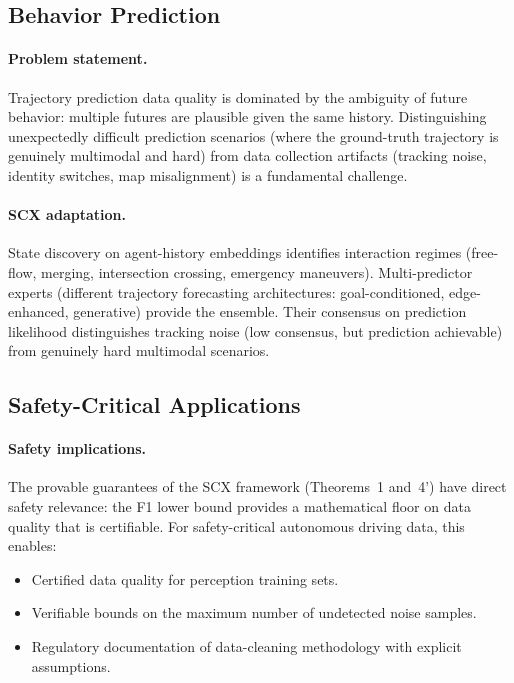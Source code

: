 \documentclass[twocolumn]{article}
\theoremstyle{definition}
\begin{document}
\subsection{Behavior Prediction}

\paragraph{Problem statement.}
Trajectory prediction data quality is dominated by the ambiguity of future behavior: multiple futures are plausible given the same history. Distinguishing unexpectedly difficult prediction scenarios (where the ground-truth trajectory is genuinely multimodal and hard) from data collection artifacts (tracking noise, identity switches, map misalignment) is a fundamental challenge.

\paragraph{SCX adaptation.}
State discovery on agent-history embeddings identifies interaction regimes (free-flow, merging, intersection crossing, emergency maneuvers). Multi-predictor experts (different trajectory forecasting architectures: goal-conditioned, edge-enhanced, generative) provide the ensemble. Their consensus on prediction likelihood distinguishes tracking noise (low consensus, but prediction achievable) from genuinely hard multimodal scenarios.

\subsection{Safety-Critical Applications}

\paragraph{Safety implications.}
The provable guarantees of the SCX framework (Theorems~1 and~4') have direct safety relevance: the F1 lower bound provides a mathematical floor on data quality that is certifiable. For safety-critical autonomous driving data, this enables:
\begin{itemize}[nosep]
  \item Certified data quality for perception training sets.
  \item Verifiable bounds on the maximum number of undetected noise samples.
  \item Regulatory documentation of data-cleaning methodology with explicit assumptions.
\end{itemize}
\end{document}
